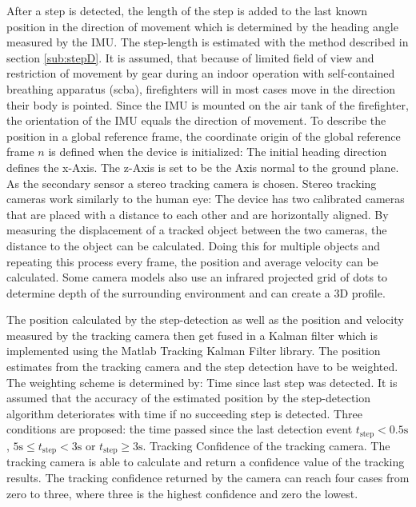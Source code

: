 \documentclass[engproc,conferenceproceedings,submit,pdftex,moreauthors]{Definitions/mdpi}
\begin{document}
After a step is detected, the length of the step is added to the last known position in the direction of movement which is determined by the heading angle measured by the IMU. The step-length is estimated with the method described in section \ref{sub:stepD}. It is assumed, that because of limited field of view and restriction of movement by gear during an indoor operation with self-contained breathing apparatus (scba), firefighters will in most cases move in the direction their body is pointed. Since the IMU is mounted on the air tank of the firefighter, the orientation of the IMU equals the direction of movement. To describe the position in a global reference frame, the coordinate origin of the global reference frame $n$ is defined when the device is initialized: The initial heading direction defines the x-Axis. The z-Axis is set to be the Axis normal to the ground plane. As the secondary sensor a stereo tracking camera is chosen. Stereo tracking cameras work similarly to the human eye: The device has two calibrated cameras that are placed with a distance to each other and are horizontally aligned. By measuring the displacement of a tracked object between the two cameras, the distance to the object can be calculated. 
Doing this for multiple objects and repeating this process every frame, the position and average velocity can be calculated. 
Some camera models also use an infrared projected grid of dots to determine depth of the surrounding environment and can create a 3D profile.


The position calculated by the step-detection as well as the position and velocity measured by the tracking camera then get fused in a Kalman filter which is implemented using the Matlab Tracking Kalman Filter library.
The position estimates from the tracking camera and the step detection have to be weighted. The weighting scheme is determined by: Time since last step was detected. It is assumed that the accuracy of the estimated position by the step-detection algorithm deteriorates with time if no succeeding step is detected. Three conditions are proposed: the time passed since the last detection event $t_{\text{step}} < 0.5\mathrm{s}$, $5\mathrm{s} \leq t_{\text{step}} < 3\mathrm{s}$ or $t_{\text{step}} \geq 3\mathrm{s}$. Tracking Confidence of the tracking camera. The tracking camera is able to calculate and return a confidence value of the tracking results. The tracking confidence returned by the camera can reach four cases from zero to three, where three is the highest confidence and zero the lowest.
\end{document}

